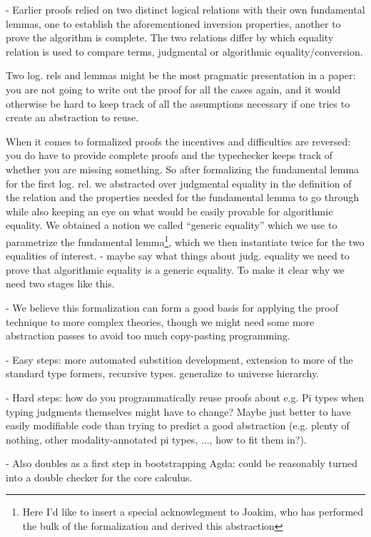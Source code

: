 \documentclass{article}
\begin{document}
 - Earlier proofs relied on two distinct logical relations with their
 own fundamental lemmas, one to establish the aforementioned inversion
 properties, another to prove the algorithm is complete.
 The two relations differ by which equality relation is used to
 compare terms, judgmental or algorithmic equality/conversion.
 
 Two log. rels and lemmas might be the most pragmatic presentation in
 a paper: you are not going to write out the proof for all the cases
 again, and it would otherwise be hard to keep track of all the
 assumptions necessary if one tries to create an abstraction to reuse.

 When it comes to formalized proofs the incentives and difficulties
 are reversed: you do have to provide complete proofs and the
 typechecker keeps track of whether you are missing something. So
 after formalizing the fundamental lemma for the first log. rel. we
 abstracted over judgmental equality in the definition of the relation
 and the properties needed for the fundamental lemma to go through
 while also keeping an eye on what would be easily provable for
 algorithmic equality.  We obtained a notion we called ``generic
 equality'' which we use to parametrize the fundamental
 lemma\footnote{Here I'd like to insert a special acknowlegment to
   Joakim, who has performed the bulk of the formalization and derived
   this abstraction}, which we then instantiate twice for the two
 equalities of interest.
   - maybe say what things about judg. equality we need to prove that
   algorithmic equality is a generic equality. To make it clear why we need two stages like this.
   
 - We believe this formalization can form a good basis for applying
 the proof technique to more complex theories, though we might need
 some more abstraction passes to avoid too much copy-pasting programming.

 - Easy steps: more automated substition development, extension to
 more of the standard type formers, recursive types. generalize to universe hierarchy.

 - Hard steps: how do you programmatically reuse proofs about e.g. Pi
 types when typing judgments themselves might have to change? Maybe
 just better to have easily modifiable code than trying to predict a
 good abstraction (e.g. plenty of nothing, other modality-annotated pi types, ..., how to fit them in?).
 
 - Also doubles as a first step in bootstrapping Agda: could be
 reasonably turned into a double checker for the core calculus.
\end{document}
